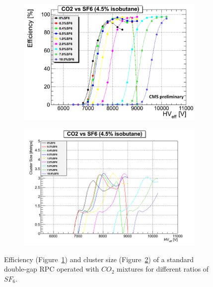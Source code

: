 	\begin{figure}[H]
		\begin{subfigure}{0.5\linewidth}
			\centering
			\includegraphics[width=\linewidth]{fig/chapt3/CO2-UGent.png}
			\caption{\label{fig:UGent-CO2:A}}
		\end{subfigure}
		\begin{subfigure}{0.5\linewidth}
			\centering
			\includegraphics[width=\linewidth]{fig/chapt3/CO2-CS-UGent.png}
			\caption{\label{fig:UGent-CO2:B}}
		\end{subfigure}
		\caption{\label{fig:UGent-CO2} Efficiency (Figure~\ref{fig:UGent-CO2:A}) and cluster size (Figure~\ref{fig:UGent-CO2:B}) of a standard double-gap RPC operated with $CO_2$ mixtures for different ratios of $SF_6$.}
	\end{figure}

\begingroup\setlength{\intextsep}{5pt}\setlength{\columnsep}{15pt}

